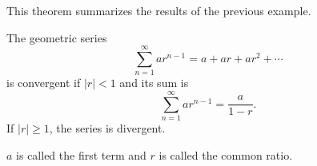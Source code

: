 \begin{frame}
This theorem summarizes the results of the previous example.
\begin{theorem}
The geometric series
\[
\sum_{n=1}^\infty ar^{n-1} = a + ar + ar^2 + \cdots
\]
is convergent if $|r| < 1$ and its sum is
\[
\sum_{n=1}^\infty ar^{n-1} = \frac{a}{1-r}.
\]
If $|r| \geq 1$, the series is divergent.

$a$ is called the first term and $r$ is called the common ratio.
\end{theorem}
\end{frame}
